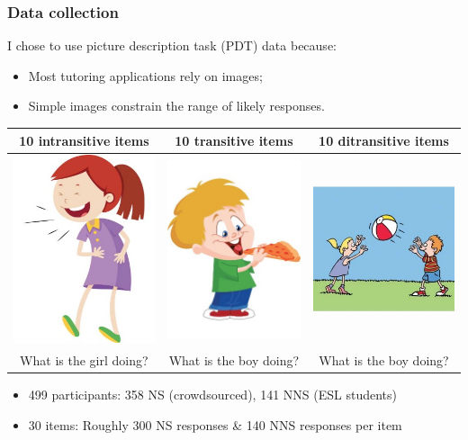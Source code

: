\documentclass[xcolor={dvipsnames}]{beamer}
\begin{document}
\begin{frame}
\frametitle{Data collection}
\pause
I chose to use picture description task (PDT) data because:
\begin{itemize}
\pause
\item Most tutoring applications rely on images;
\pause
\item Simple images constrain the range of likely responses.
\end{itemize}
\pause
\begin{table}[width=.8\columnwidth]\small
\begin{center}
\begin{tabular}{|c|c|c|}
\hline
10 intransitive items & 10 transitive items & 10 ditransitive items \\
\hline
{\includegraphics[width=0.2\columnwidth]{figures/I20.jpg}} & {\includegraphics[width=0.2\columnwidth]{figures/I02.jpg}} & {\includegraphics[width=0.25\columnwidth]{figures/I21.jpg}} \\
\hline
What is the girl doing? & What is the boy doing? & What is the boy doing? \\
\hline
\end{tabular}
\end{center}
\end{table}
\smallskip
\begin{itemize}
\pause
\item 499 participants: 358 NS (crowdsourced), 141 NNS (ESL students)
\pause
\item 30 items: Roughly 300 NS responses \& 140 NNS responses per item
\end{itemize}
\end{frame}
\end{document}
